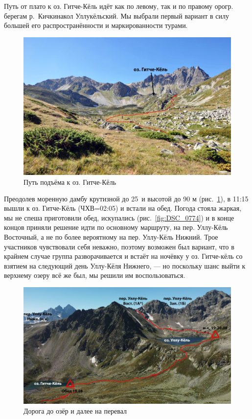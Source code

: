 Путь от плато к оз. Гитче-Кёль идёт как по левому, так и по правому орогр. берегам р.~Кичкинакол Уллукёльский. Мы выбрали первый вариант в силу большей его распространённости и маркированности турами. 

\begin{figure}[h!]
	\centering
	\includegraphics[width=0.7\linewidth]{../pics/DSC_0718}
	\caption{Путь подъёма к оз. Гитче-Кёль}
	\label{fig:DSC_0718}
\end{figure}

Преодолев моренную дамбу крутизной до 25\degree~и высотой до 90 м (рис.~\ref{fig:DSC_0718}), в 11:15 вышли к оз. Гитче-Кёль (ЧХВ=02:05) и встали на обед. 
Погода стояла жаркая, мы не спеша приготовили обед, искупались (рис.~\ref{fig:DSC_0774}) и в конце концов приняли решение идти по основному маршруту, на пер. Уллу-Кёль Восточный, а не по более вероятному на пер. Уллу-Кёль Нижний. Трое участников чувствовали себя неважно, поэтому возможен был вариант, что в крайнем случае группа разворачивается и встаёт на ночёвку у оз. Гитче-кёль со взятием на следующий день Уллу-Кёля Нижнего, — но поскольку шанс выйти к верхнему озеру всё же был, мы решили им воспользоваться.

\begin{figure}[h!]
	\centering
	\includegraphics[width=0.7\linewidth]{../pics/ullu_kuel_route}
	\caption{Дорога до озёр и далее на перевал}
	\label{fig:ullu_kuel_route}
\end{figure}

